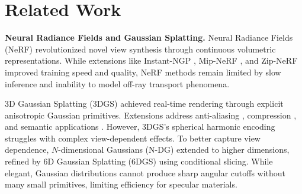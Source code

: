 \documentclass{article} %
\begin{document}
\section{Related Work}
\label{sec:related_work}

\textbf{Neural Radiance Fields and Gaussian Splatting.}
Neural Radiance Fields (NeRF) \citep{mildenhall2021nerf} revolutionized novel view synthesis through continuous volumetric representations. While extensions like Instant-NGP \citep{M_ller_2022}, Mip-NeRF \citep{barron2021mipnerf}, and Zip-NeRF \citep{barron2023zipnerfantialiasedgridbasedneural} improved training speed and quality, NeRF methods remain limited by slow inference and inability to model off-ray transport phenomena.

3D Gaussian Splatting (3DGS) \citep{3dgs} achieved real-time rendering through explicit anisotropic Gaussian primitives. Extensions address anti-aliasing \citep{yu2023mipsplattingaliasfree3dgaussian, yan2024multiscale3dgaussiansplatting}, compression \citep{lee2024compact, morgenstern2024compact}, and semantic applications \citep{shi2023languageembedded3dgaussians,zhou2024feature3dgssupercharging3d,peng20253dvisionlanguagegaussiansplatting,xiong2025splatfeaturesolver}. However, 3DGS's spherical harmonic encoding struggles with complex view-dependent effects. To better capture view dependence, $N$-dimensional Gaussians (N-DG) \citep{diolatzis2024n} extended to higher dimensions, refined by 6D Gaussian Splatting (6DGS) \citep{gao20246dgs} using conditional slicing. While elegant, Gaussian distributions cannot produce sharp angular cutoffs without many small primitives, limiting efficiency for specular materials.
\end{document}
